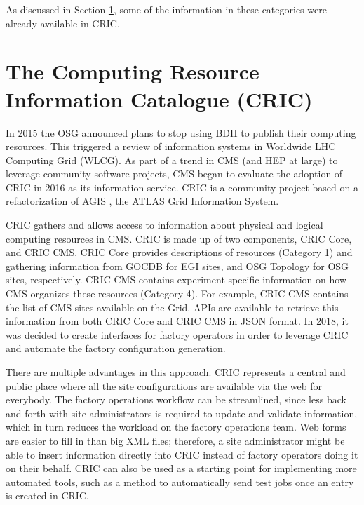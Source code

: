 \documentclass{webofc}
\begin{document}
As discussed in Section \ref{cric}, some of the information in these categories were already available in CRIC.

\section{The Computing Resource Information Catalogue (CRIC)}
\label{cric}
In 2015 the OSG \cite{OSG} announced plans to stop using BDII \cite{BDII2010} to publish their computing resources. This triggered a review of information systems in Worldwide LHC Computing Grid (WLCG). As part of a trend in CMS (and HEP at large) to leverage community software projects, CMS began to evaluate the adoption of CRIC in 2016 as its information service. CRIC is a community project based on a refactorization of AGIS \cite{Anisenkov2017}, the ATLAS Grid Information System. %

CRIC gathers and allows access to information about physical and logical computing resources in CMS. CRIC is made up of two components, CRIC Core, and CRIC CMS. CRIC Core provides descriptions of resources (Category 1) and gathering information from GOCDB for EGI sites, and OSG Topology for OSG sites, respectively. CRIC CMS contains experiment-specific information on how CMS organizes these resources (Category 4). For example, CRIC CMS contains the list of CMS sites available on the Grid. APIs are available to retrieve this information from both CRIC Core and CRIC CMS in JSON format.
In 2018, it was decided to create interfaces for factory operators in order to leverage CRIC and automate the factory configuration generation.

There are multiple advantages in this approach. CRIC represents a central and public place where all the site configurations are available via the web for everybody. The factory operations workflow can be streamlined, since less back and forth with site administrators is required to update and validate information, which in turn reduces the workload on the factory operations team. Web forms are easier to fill in than big XML files; therefore, a site administrator might be able to insert information directly into CRIC instead of factory operators doing it on their behalf. CRIC can also be used as a starting point for implementing more automated tools, such as a method to automatically send test jobs once an entry is created in CRIC.
\end{document}
